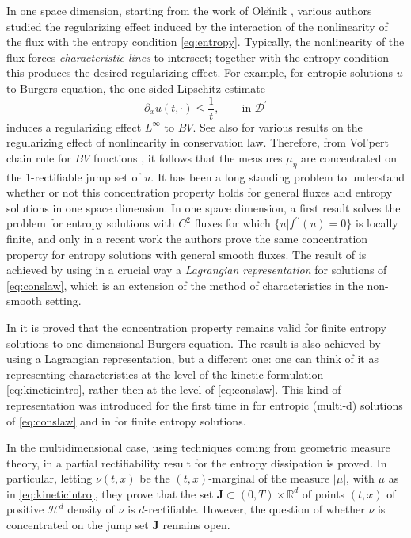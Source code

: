 \documentclass[11pt, twoside, reqno]{amsart}
\theoremstyle{definition}
\theoremstyle{remark}
\numberwithin{equation}{section}
\newcommand{\second}{{\prime \prime}}
\newcommand{\msc}[1]{\mathscr{#1}}
\begin{document}
In one space dimension, starting from the work of Ole{\u\i}nik \cite{Oleinik_translation}, various authors studied the regularizing effect induced by the interaction of the nonlinearity of the flux with the entropy condition \eqref{eq:entropy}. Typically, the nonlinearity of the flux forces \textit{characteristic lines} to intersect; together with the entropy condition this produces the desired regularizing effect. For example, for entropic solutions $u$ to Burgers equation, the one-sided Lipschitz estimate 
$$
\partial_x u(t, \cdot) \leq \frac{1}{t}, \qquad \text{in $\msc D^{\prime}$}
$$
induces a regularizing effect $L^{\infty}$ to $BV$. See also   \cite{ABM25, AT26, BM_structure, Junca, LPT_kineticise, LPT_kinetic, Mar_reg} for various results on the regularizing effect of nonlinearity in conservation law.  Therefore, from Vol'pert chain rule for $BV$ functions \cite{volpert_chain}, it follows that the measures $\mu_{\eta}$ are concentrated on the 1-rectifiable jump set of $u$. It has been a long standing problem to understand whether or not this concentration property holds for general fluxes and entropy solutions in one space dimension. In one space dimension, a first result \cite{DLR03} solves the problem for entropy solutions with $C^2$ fluxes for which $\{u | f^\second(u) = 0 \}$ is locally finite, and only in a recent work \cite{BM_structure} the authors prove the same concentration property for entropy solutions with general smooth fluxes. The result of \cite{BM_structure} is achieved by using in a crucial way a \textit{Lagrangian representation} for solutions of \eqref{eq:conslaw}, which is an extension of the method of characteristics in the non-smooth setting.

In \cite{marconi_burgers} it is proved that the concentration property remains valid for finite entropy solutions to one dimensional Burgers equation. The result is also achieved by using a Lagrangian representation, but a different one: one can think of it as representing characteristics at the level of the kinetic formulation \eqref{eq:kineticintro}, rather then at the level of \eqref{eq:conslaw}. This kind of representation was introduced for the first time in \cite{BBM_multid} for entropic (multi-d) solutions of \eqref{eq:conslaw} and in \cite{marconi_structure} for finite entropy solutions.

In the multidimensional case, using techniques coming from geometric measure theory, in \cite{DOW03} a partial rectifiability result for the entropy dissipation is proved. In particular, letting $\nu(t, x)$ be the $(t, x)$-marginal of the measure $|\mu|$, with $\mu$ as in \eqref{eq:kineticintro}, they prove that the set $\mathbf J \subset (0,T) \times \mathbb R^d$  of points $(t, x)$ of positive $\msc H^{d}$ density of $\nu$ is $d$-rectifiable.  However, the question of whether $\nu$ is concentrated on the jump set $\mathbf J$ remains open.
\end{document}
